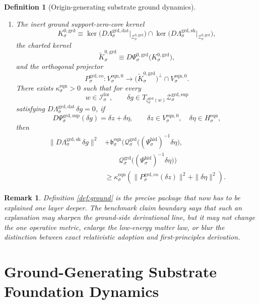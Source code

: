 \documentclass[11pt]{article}
\newcommand{\ForSpace}[1]{\mathcal I_{#1}^{\mathrm{for}}}
\newcommand{\HiddenChart}[1]{\Psi_{#1}^{\mathrm{hid}}}
\newcommand{\GroundData}[1]{\Lambda_{#1}^{\mathrm{grd,dat}}}
\newcommand{\GroundShellMap}[1]{\Lambda_{#1}^{\mathrm{grd,sh}}}
\newcommand{\GroundSupportShell}[1]{\mathcal Z_{#1}^{\mathrm{grd,sup}}}
\newcommand{\GroundZeroCore}[1]{\mathcal Z_{#1}^{0,\mathrm{grd}}}
\newcommand{\GroundEqChart}[1]{\Psi_{#1}^{\mathrm{grd,sup}}}
\newcommand{\GroundZeroChart}[1]{\Psi_{#1}^{0,\mathrm{grd}}}
\newcommand{\GroundCharge}[1]{\mathcal Q_{#1}^{\mathrm{grd}}}
\newcommand{\GroundEmbed}[1]{\zeta_{#1}^{\mathrm{grd}}}
\newcommand{\GroundKernel}[1]{K_{#1}^{0,\mathrm{grd}}}
\newcommand{\GroundKernelCh}[1]{\widetilde K_{#1}^{0,\mathrm{grd}}}
\newcommand{\GroundStateComp}[1]{P_{#1}^{\mathrm{grd,co}}}
\newcommand{\EqnPair}[1]{\mathfrak b_{#1}^{\mathrm{eqn}}}
\newcommand{\EqnHidden}[1]{H_{#1}^{\mathrm{eqn}}}
\newcommand{\EqnZero}[1]{V_{#1}^{\mathrm{eqn},0}}
\newtheorem{definition}{Definition}
\newtheorem{remark}{Remark}
\begin{document}
\begin{definition}[Origin-generating substrate ground dynamics]
\begin{enumerate}
    \item The inert ground support-zero-core kernel
    \[
    \GroundKernel{\sigma}
    \equiv
    \ker\bigl(D\GroundData{\sigma}\big|_{\GroundZeroCore{\sigma}}\bigr)
    \cap
    \ker\bigl(D\GroundShellMap{\sigma}\big|_{\GroundZeroCore{\sigma}}\bigr),
    \]
    the charted kernel
    \[
    \GroundKernelCh{\sigma}
    \equiv
    D\GroundZeroChart{\sigma}\bigl(\GroundKernel{\sigma}\bigr),
    \]
    and the orthogonal projector
    \[
    \GroundStateComp{\sigma}:
    \EqnZero{\sigma}\to
    \bigl(\GroundKernelCh{\sigma}\bigr)^{\perp}\cap\EqnZero{\sigma}.
    \]
    There exists \(\kappa_{\sigma}^{\mathrm{eqn}}>0\) such that for every
    \[
    w\in\ForSpace{\sigma},
    \qquad
    \delta g\in T_{\GroundEmbed{\sigma}(w)}\GroundSupportShell{\sigma}
    \]
    satisfying \(D\GroundData{\sigma}\,\delta g=0\), if
    \[
    D\GroundEqChart{\sigma}(\delta g)=\delta z+\delta\eta,
    \qquad
    \delta z\in\EqnZero{\sigma},
    \quad
    \delta\eta\in\EqnHidden{\sigma},
    \]
    then
    \begin{equation}
    \begin{aligned}
    \|D\GroundShellMap{\sigma}\,\delta g\|^{2}
    &+
    \EqnPair{\sigma}\bigl(
    \GroundCharge{\sigma}\bigl((\HiddenChart{\sigma})^{-1}\delta\eta\bigr),\\
    &\qquad
    \GroundCharge{\sigma}\bigl((\HiddenChart{\sigma})^{-1}\delta\eta\bigr)
    \bigr)
    \\
    &\ge
    \kappa_{\sigma}^{\mathrm{eqn}}
    \left(
    \|\GroundStateComp{\sigma}(\delta z)\|^{2}
    +
    \|\delta\eta\|^{2}
    \right).
    \end{aligned}
    \label{eq:groundcoercive}
    \end{equation}
\end{enumerate}
\end{definition}

\begin{remark}
Definition \ref{def:ground} is the precise package that now has to be explained one layer deeper. The benchmark claim boundary says that such an explanation may sharpen the ground-side derivational line, but it may not change the one operative metric, enlarge the low-energy matter law, or blur the distinction between exact relativistic adoption and first-principles derivation.
\end{remark}

\section{Ground-Generating Substrate Foundation Dynamics}
\end{document}

